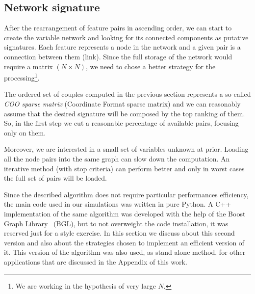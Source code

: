 \documentclass{standalone}
\begin{document}
\subsection[Network Signature]{Network signature}\label{implementation:network}

After the rearrangement of feature pairs in ascending order, we can start to create the variable network and looking for its connected components as putative signatures.
Each feature represents a node in the network and a given pair is a connection between them (link).
Since the full storage of the network would require a matrix $(N\times N)$, we need to chose a better strategy for the processing\footnote{
  We are working in the hypothesis of very large $N$.
}.

The ordered set of couples computed in the previous section represents a so-called \emph{COO sparse matrix} (Coordinate Format sparse matrix) and we can reasonably assume that the desired signature will be composed by the top ranking of them.
So, in the first step we cut a reasonable percentage of available pairs, focusing only on them.

Moreover, we are interested in a small set of variables unknown at prior.
Loading all the node pairs into the same graph can slow down the computation.
An iterative method (with stop criteria) can perform better and only in worst cases the full set of pairs will be loaded.

Since the described algorithm does not require particular performances efficiency, the main code used in our simulations was written in pure \textsf{Python}.
A \textsf{C++} implementation of the same algorithm was developed with the help of the Boost Graph Library~\cite{BGL} (BGL), but to not overweight the code installation, it was reserved just for a style exercise.
In this section we discuss about this second version and also about the strategies chosen to implement an efficient version of it.
This version of the algorithm was also used, as stand alone method, for other applications that are discussed in the Appendix of this work.
\end{document}
